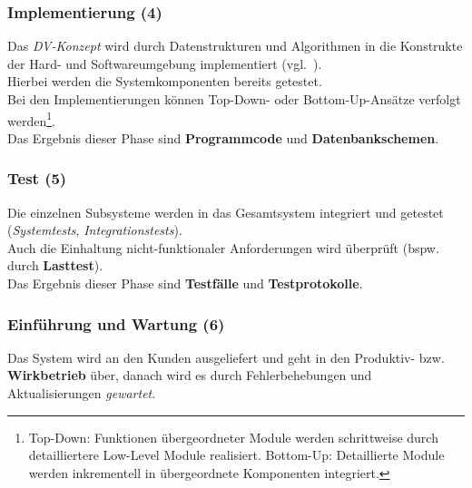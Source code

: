 \subsubsection{Implementierung (4)}
Das \textit{DV-Konzept} wird durch Datenstrukturen und Algorithmen in die Konstrukte der Hard- und Softwareumgebung implementiert (vgl.~\cite[319]{AABG14n}).\\
Hierbei werden die Systemkomponenten bereits getestet.\\
Bei den Implementierungen können Top-Down- oder Bottom-Up-Ansätze verfolgt werden\footnote{
    Top-Down: Funktionen übergeordneter Module werden schrittweise durch detailliertere Low-Level Module realisiert. Bottom-Up: Detaillierte Module werden inkrementell in übergeordnete Komponenten integriert.
}.\\
Das Ergebnis dieser Phase sind \textbf{Programmcode} und \textbf{Datenbankschemen}.

\subsubsection{Test (5)}
Die einzelnen Subsysteme werden in das Gesamtsystem integriert und getestet (\textit{Systemtests}, \textit{Integrationstests}).\\
Auch die Einhaltung nicht-funktionaler Anforderungen wird überprüft (bspw. durch \textbf{Lasttest}).\\
Das Ergebnis dieser Phase sind \textbf{Testfälle} und \textbf{Testprotokolle}.

\subsubsection{Einführung und Wartung (6)}
Das System wird an den Kunden ausgeliefert und geht in den Produktiv- bzw. \textbf{Wirkbetrieb} über, danach wird es durch Fehlerbehebungen und Aktualisierungen \textit{gewartet}.
